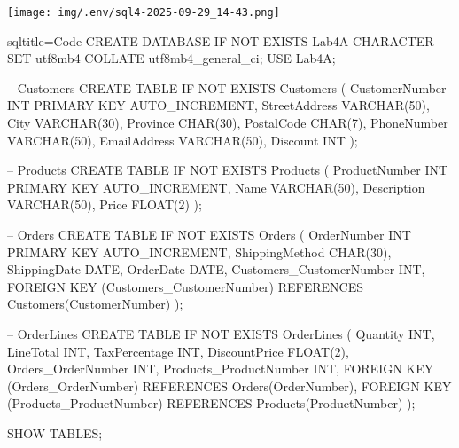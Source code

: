 \begin{center}
\end{center}

\texttt{[image: img/.env/sql4-2025-09-29\_14-43.png]}

\begin{NxCodeBox}{sql}{title={Code}}
CREATE DATABASE IF NOT EXISTS Lab4A
	CHARACTER SET utf8mb4
	COLLATE utf8mb4_general_ci;
USE Lab4A;

-- Customers
CREATE TABLE IF NOT EXISTS Customers (
	CustomerNumber INT PRIMARY KEY AUTO_INCREMENT,
	StreetAddress VARCHAR(50),
	City VARCHAR(30),
	Province CHAR(30),
	PostalCode CHAR(7),
	PhoneNumber VARCHAR(50),
	EmailAddress VARCHAR(50),
	Discount INT
);

-- Products
CREATE TABLE IF NOT EXISTS Products (
	ProductNumber INT PRIMARY KEY AUTO_INCREMENT,
	Name VARCHAR(50),
	Description VARCHAR(50),
	Price FLOAT(2)
);

-- Orders
CREATE TABLE IF NOT EXISTS Orders (
	OrderNumber INT PRIMARY KEY AUTO_INCREMENT,
	ShippingMethod CHAR(30),
	ShippingDate DATE,
	OrderDate DATE,
	Customers_CustomerNumber INT,
	FOREIGN KEY (Customers_CustomerNumber) REFERENCES Customers(CustomerNumber)
);

-- OrderLines
CREATE TABLE IF NOT EXISTS OrderLines (
	Quantity INT,
	LineTotal INT,
	TaxPercentage INT,
	DiscountPrice FLOAT(2),
	Orders_OrderNumber INT,
	Products_ProductNumber INT,
	FOREIGN KEY (Orders_OrderNumber) REFERENCES Orders(OrderNumber),
	FOREIGN KEY (Products_ProductNumber) REFERENCES Products(ProductNumber)
);

SHOW TABLES;
\end{NxCodeBox}

